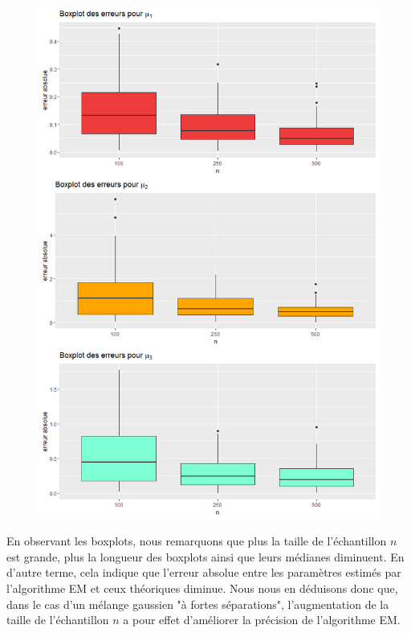\documentclass[frenchb]{report}
\newcommand{\1}{\mathbbm{1}}
\theoremstyle{definition}\newtheorem{defn}{Définition}
\theoremstyle{definition}\newtheorem{exm}{Exemple}
\theoremstyle{definition}\newtheorem{nota}{Notation}
\theoremstyle{definition}\newtheorem{rem}{Remarque}
\begin{document}
\begin{figure}[htp]
{		\includegraphics[scale=0.35]{images/good_mu.png}%
		\label{fig:b}%
	}%
\end{figure}

En observant les boxplots, nous remarquons que plus la taille de l'échantillon $n$ est grande, plus la longueur des boxplots ainsi que leurs médianes diminuent. En d'autre terme, cela indique que l'erreur absolue entre les paramètres estimés par l'algorithme EM et ceux théoriques diminue. Nous nous en déduisons donc que, dans le cas d'un mélange gaussien "à fortes séparations", l'augmentation de la taille de l'échantillon $n$ a pour effet d'améliorer la précision de l'algorithme EM.
\newpage
\end{document}
